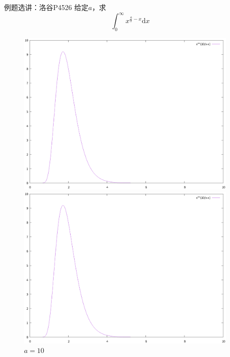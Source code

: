 \documentclass{beamer}
\begin{document}
\begin{frame}{例题选讲：洛谷P4526}
    给定$a$，求
    \begin{equation*}
        \int_0^\infty x^{\frac{a}{x}-x} \text{d}x
    \end{equation*}

    \pause
    \begin{figure}
        \begin{minipage}[t]{0.32\textwidth}
            \centering
            \includegraphics[width=0.95\textwidth]{pic/p4526-2.eps}
            \caption{$a=1$}
        \end{minipage}
        \begin{minipage}[t]{0.32\textwidth}
            \centering
            \includegraphics[width=0.95\textwidth]{pic/p4526-2.eps}
            \caption{$a=10$}

\end{minipage}
\end{figure}
\end{frame}
\end{document}
